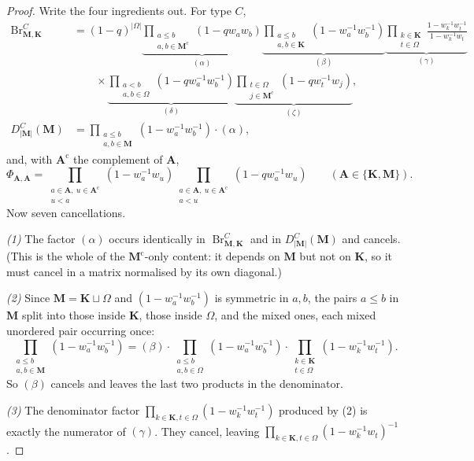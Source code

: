 \documentclass[11pt]{article}
\theoremstyle{plain}
\theoremstyle{definition}
\theoremstyle{remark}
\newcommand{\bM}{\mathbf M}
\newcommand{\bK}{\mathbf K}
\newcommand{\bA}{\mathbf A}
\newcommand{\cm}{{\mathrm c}}
\newcommand{\Br}{\operatorname{Br}}
\newcommand{\Om}{\Omega}
\begin{document}
\begin{proof}
Write the four ingredients out. For type $C$,
\begin{align*}
\Br^C_{\bM,\bK}&=(1-q)^{|\Om|}
\underbrace{\prod_{\substack{a\le b\\a,b\in\bM^\cm}}\!\!(1-qw_aw_b)}_{(\alpha)}
\underbrace{\prod_{\substack{a\le b\\a,b\in\bK}}\!\!(1-w_a^{-1}w_b^{-1})}_{(\beta)}
\underbrace{\prod_{\substack{k\in\bK\\t\in\Om}}\frac{1-w_k^{-1}w_t^{-1}}{1-w_k^{-1}w_t}}_{(\gamma)}\\
&\qquad\times
\underbrace{\prod_{\substack{a<b\\a,b\in\Om}}\!\!(1-qw_a^{-1}w_b^{-1})}_{(\delta)}
\underbrace{\prod_{\substack{t\in\Om\\j\in\bM^\cm}}\!\!(1-qw_t^{-1}w_j)}_{(\zeta)},\\
D^C_{|\bM|}(\bM)&=\prod_{\substack{a\le b\\a,b\in\bM}}(1-w_a^{-1}w_b^{-1})\cdot(\alpha),
\end{align*}
and, with $\bA^\cm$ the complement of $\bA$,
\[
\Phi_{\bA,\bA}=\prod_{\substack{a\in\bA,\ u\in\bA^\cm\\u<a}}(1-w_a^{-1}w_u)
\prod_{\substack{a\in\bA,\ u\in\bA^\cm\\a<u}}(1-qw_a^{-1}w_u)
\qquad(\bA\in\{\bK,\bM\}).
\]
Now seven cancellations.

\emph{(1)} The factor $(\alpha)$ occurs identically in $\Br^C_{\bM,\bK}$ and in
$D^C_{|\bM|}(\bM)$ and cancels. (This is the whole of the $\bM^\cm$-only content:
it depends on $\bM$ but not on $\bK$, so it must cancel in a matrix normalised by
its own diagonal.)

\emph{(2)} Since $\bM=\bK\sqcup\Om$ and $(1-w_a^{-1}w_b^{-1})$ is symmetric in
$a,b$, the pairs $a\le b$ in $\bM$ split into those inside $\bK$, those inside
$\Om$, and the mixed ones, each mixed unordered pair occurring once:
\[
\prod_{\substack{a\le b\\a,b\in\bM}}(1-w_a^{-1}w_b^{-1})
=(\beta)\cdot
\prod_{\substack{a\le b\\a,b\in\Om}}(1-w_a^{-1}w_b^{-1})\cdot
\prod_{\substack{k\in\bK\\t\in\Om}}(1-w_k^{-1}w_t^{-1}).
\]
So $(\beta)$ cancels and leaves the last two products in the denominator.

\emph{(3)} The denominator factor $\prod_{k\in\bK,t\in\Om}(1-w_k^{-1}w_t^{-1})$
produced by (2) is exactly the numerator of $(\gamma)$. They cancel, leaving
$\prod_{k\in\bK,t\in\Om}(1-w_k^{-1}w_t)^{-1}$.


\end{proof}
\end{document}

